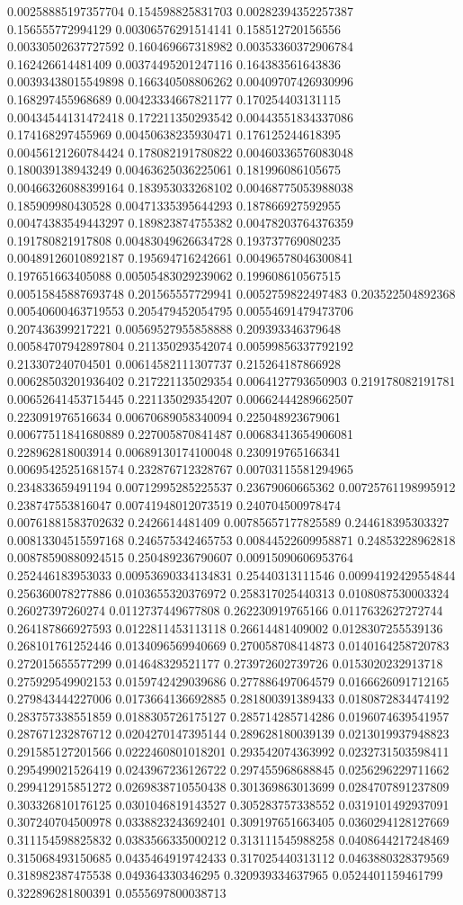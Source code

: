 \begin{table}
\begin{tabu}
\begin{sparkline}{10}
0.00258885197357704 0.154598825831703 0.00282394352257387 0.156555772994129 0.00306576291514141 0.158512720156556 0.00330502637727592 0.160469667318982 0.00353360372906784 0.162426614481409 0.00374495201247116 0.164383561643836 0.00393438015549898 0.166340508806262 0.00409707426930996 0.168297455968689 0.00423334667821177 0.170254403131115 0.00434544131472418 0.172211350293542 0.00443551834337086 0.174168297455969 0.00450638235930471 0.176125244618395 0.00456121260784424 0.178082191780822 0.00460336576083048 0.180039138943249 0.00463625036225061 0.181996086105675 0.00466326088399164 0.183953033268102 0.00468775053988038 0.185909980430528 0.00471335395644293 0.187866927592955 0.00474383549443297 0.189823874755382 0.00478203764376359 0.191780821917808 0.00483049626634728 0.193737769080235 0.00489126010892187 0.195694716242661 0.00496578046300841 0.197651663405088 0.00505483029239062 0.199608610567515 0.00515845887693748 0.201565557729941 0.0052759822497483 0.203522504892368 0.00540600463719553 0.205479452054795 0.00554691479473706 0.207436399217221 0.00569527955858888 0.209393346379648 0.00584707942897804 0.211350293542074 0.00599856337792192 0.213307240704501 0.00614582111307737 0.215264187866928 0.00628503201936402 0.217221135029354 0.0064127793650903 0.219178082191781 0.00652641453715445 0.221135029354207 0.00662444289662507 0.223091976516634 0.00670689058340094 0.225048923679061 0.00677511841680889 0.227005870841487 0.00683413654906081 0.228962818003914 0.00689130174100048 0.230919765166341 0.00695425251681574 0.232876712328767 0.00703115581294965 0.234833659491194 0.00712995285225537 0.23679060665362 0.00725761198995912 0.238747553816047 0.00741948012073519 0.240704500978474 0.00761881583702632 0.2426614481409 0.00785657177825589 0.244618395303327 0.00813304515597168 0.246575342465753 0.00844522609958871 0.24853228962818 0.00878590880924515 0.250489236790607 0.00915090606953764 0.252446183953033 0.00953690334134831 0.25440313111546 0.00994192429554844 0.256360078277886 0.0103655320376972 0.258317025440313 0.0108087530003324 0.26027397260274 0.0112737449677808 0.262230919765166 0.0117632627272744 0.264187866927593 0.0122811453113118 0.26614481409002 0.0128307255539136 0.268101761252446 0.0134096569940669 0.270058708414873 0.0140164258720783 0.272015655577299 0.014648329521177 0.273972602739726 0.0153020232913718 0.275929549902153 0.0159742429039686 0.277886497064579 0.0166626091712165 0.279843444227006 0.0173664136692885 0.281800391389433 0.0180872834474192 0.283757338551859 0.0188305726175127 0.285714285714286 0.0196074639541957 0.287671232876712 0.0204270147395144 0.289628180039139 0.0213019937948823 0.291585127201566 0.0222460801018201 0.293542074363992 0.0232731503598411 0.295499021526419 0.0243967236126722 0.297455968688845 0.0256296229711662 0.299412915851272 0.0269838710550438 0.301369863013699 0.0284707891237809 0.303326810176125 0.0301046819143527 0.305283757338552 0.0319101492937091 0.307240704500978 0.0338823243692401 0.309197651663405 0.0360294128127669 0.311154598825832 0.0383566335000212 0.313111545988258 0.0408644217248469 0.315068493150685 0.0435464919742433 0.317025440313112 0.0463880328379569 0.318982387475538 0.049364330346295 0.320939334637965 0.0524401159461799 0.322896281800391 0.0555697800038713 
\end{sparkline}
\end{tabu}
\end{table}
